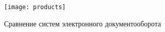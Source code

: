 \begin{figure}[h!]
  \centering
  \texttt{[image: products]}
  \caption{Сравнение систем электронного документооборота}
  \label{img:products}
\end{figure}
\FloatBarrier

